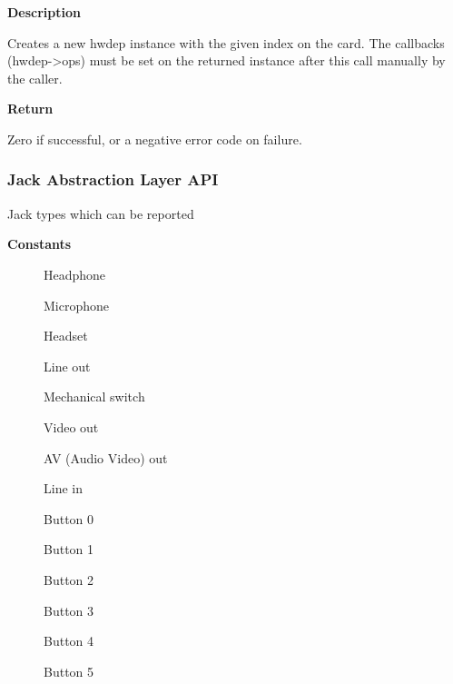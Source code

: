 \documentclass[a4paper,8pt,english]{sphinxmanual}
\begin{document}
\textbf{Description}

Creates a new hwdep instance with the given index on the card.
The callbacks (hwdep-\textgreater{}ops) must be set on the returned instance
after this call manually by the caller.

\textbf{Return}

Zero if successful, or a negative error code on failure.


\subsubsection{Jack Abstraction Layer API}
\label{sound/kernel-api/alsa-driver-api:jack-abstraction-layer-api}

\begin{fulllineitems}
\label{sound/kernel-api/alsa-driver-api:c.snd_jack_types}
Jack types which can be reported

\end{fulllineitems}


\textbf{Constants}
\begin{description}
\item[{}] \leavevmode
Headphone

\item[{}] \leavevmode
Microphone

\item[{}] \leavevmode
Headset

\item[{}] \leavevmode
Line out

\item[{}] \leavevmode
Mechanical switch

\item[{}] \leavevmode
Video out

\item[{}] \leavevmode
AV (Audio Video) out

\item[{}] \leavevmode
Line in

\item[{}] \leavevmode
Button 0

\item[{}] \leavevmode
Button 1

\item[{}] \leavevmode
Button 2

\item[{}] \leavevmode
Button 3

\item[{}] \leavevmode
Button 4

\item[{}] \leavevmode
Button 5

\end{description}
\end{document}
